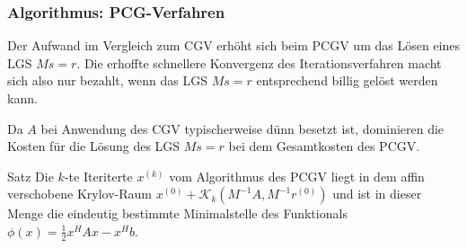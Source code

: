 \subsubsection{Algorithmus: PCG-Verfahren}

Der Aufwand im Vergleich zum CGV erhöht sich beim PCGV um das Lösen eines LGS $Ms=r$. Die erhoffte schnellere
Konvergenz des Iterationsverfahren macht sich also nur bezahlt, wenn das LGS $Ms=r$ entsprechend billig gelöst
werden kann. 

Da $A$ bei Anwendung des CGV typischerweise dünn besetzt ist, dominieren die Kosten für die Lösung des LGS $Ms=r$ 
bei dem Gesamtkosten des PCGV.

\begin{thmbox}{Satz}
  Die $k$-te Iteriterte $x^{(k)}$ vom Algorithmus des PCGV liegt in dem affin verschobene Krylov-Raum
  $x^{(0)} + \mathcal{K}_k(M^{-1}A, M^{-1}r^{(0)})$ und ist in dieser Menge die eindeutig bestimmte Minimalstelle
  des Funktionals $\phi(x) = \tfrac{1}{2}x^HAx-x^Hb$.
\end{thmbox}

